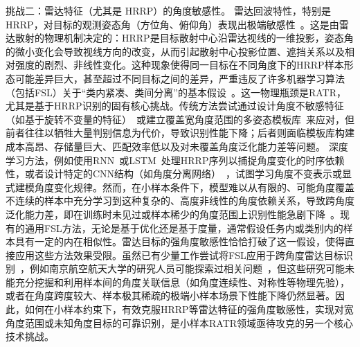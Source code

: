{{挑战二：雷达特征（尤其是 HRRP）的角度敏感性。}
雷达回波特性，特别是HRRP，对目标的观测姿态角（方位角、俯仰角）表现出极端敏感性~\cite{X}。这是由雷达散射的物理机制决定的：HRRP是目标散射中心沿雷达视线的一维投影，姿态角的微小变化会导致视线方向的改变，从而引起散射中心投影位置、遮挡关系以及相对强度的剧烈、非线性变化。这种现象使得同一目标在不同角度下的HRRP样本形态可能差异巨大，甚至超过不同目标之间的差异，严重违反了许多机器学习算法（包括FSL）关于“类内紧凑、类间分离”的基本假设~\cite{X}。这一物理瓶颈是RATR，尤其是基于HRRP识别的固有核心挑战。传统方法尝试通过设计角度不敏感特征（如基于旋转不变量的特征）~\cite{X}或建立覆盖宽角度范围的多姿态模板库~\cite{X}来应对，但前者往往以牺牲大量判别信息为代价，导致识别性能下降；后者则面临模板库构建成本高昂、存储量巨大、匹配效率低以及对未覆盖角度泛化能力差等问题。
深度学习方法，例如使用RNN~\cite{X}或LSTM~\cite{X}处理HRRP序列以捕捉角度变化的时序依赖性，或者设计特定的CNN结构（如角度分离网络）~\cite{X}，试图学习角度不变表示或显式建模角度变化规律。然而，在小样本条件下，模型难以从有限的、可能角度覆盖不连续的样本中充分学习到这种复杂的、高度非线性的角度依赖关系，导致跨角度泛化能力差，即在训练时未见过或样本稀少的角度范围上识别性能急剧下降~\cite{X}。现有的通用FSL方法，无论是基于优化还是基于度量，通常假设任务内或类别内的样本具有一定的内在相似性。雷达目标的强角度敏感性恰恰打破了这一假设，使得直接应用这些方法效果受限。虽然已有少量工作尝试将FSL应用于跨角度雷达目标识别~\cite{X}，例如南京航空航天大学的研究人员可能探索过相关问题~\cite{X}，但这些研究可能未能充分挖掘和利用样本间的角度关联信息（如角度连续性、对称性等物理先验），或者在角度跨度较大、样本极其稀疏的极端小样本场景下性能下降仍然显著。因此，如何在{小样本约束}下，有效克服HRRP等雷达特征的{强角度敏感性}，实现对{宽角度范围或未知角度}目标的可靠识别，是小样本RATR领域亟待攻克的另一个核心技术挑战。

}
